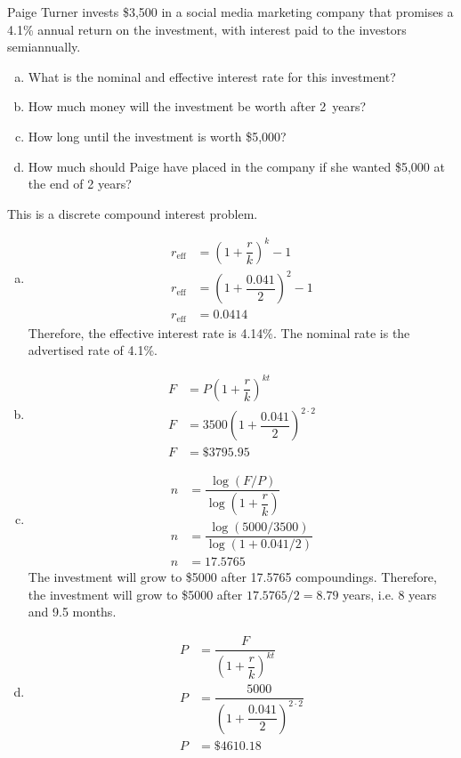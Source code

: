 \documentclass[11pt,letterpaper]{article}
\begin{document}
\newpage





 Paige Turner invests \$3,500 in a social media marketing company that promises a 4.1\% annual return on the investment, with interest paid to the investors semiannually. 
\begin{enumerate}[(a)]
\item What is the nominal and effective interest rate for this investment?
\item How much money will the investment be worth after 2~years?
\item How long until the investment is worth \$5,000?
\item How much should Paige have placed in the company if she wanted \$5,000 at the end of 2 years? 
\end{enumerate} \pspace

\sol This is a discrete compound interest problem.
\begin{enumerate}[(a)]
\item 
	\[
	\begin{aligned}
	r_{\text{eff}}&= \left(1 + \dfrac{r}{k} \right)^k - 1 \\
	r_{\text{eff}}&= \left(1 + \dfrac{0.041}{2} \right)^2 - 1 \\
	r_{\text{eff}}&= 0.0414
	\end{aligned}
	\]
Therefore, the effective interest rate is 4.14\%. The nominal rate is the advertised rate of 4.1\%.

\item 
	\[
	\begin{aligned}
	F&= P \left(1 + \dfrac{r}{k} \right)^{kt} \\
	F&= 3500 \left(1 + \dfrac{0.041}{2} \right)^{2 \cdot 2} \\
	F&= \$3795.95
	\end{aligned}
	\] \pspace

\item 
	\[
	\begin{aligned}
	n&= \dfrac{\log(F/P)}{\log\left(1 + \dfrac{r}{k} \right)} \\
	n&= \dfrac{\log(5000/3500)}{\log(1 + 0.041/2)} \\
	n&= 17.5765
	\end{aligned}
	\]
The investment will grow to \$5000 after 17.5765 compoundings. Therefore, the investment will grow to \$5000 after $17.5765/2= 8.79$ years, i.e. 8 years and 9.5 months. \pspace

\item 
	\[
	\begin{aligned}
	P&= \dfrac{F}{\left(1 + \dfrac{r}{k} \right)^{kt}} \\
	P&= \dfrac{5000}{\left(1 + \dfrac{0.041}{2} \right)^{2 \cdot 2}} \\
	P&= \$4610.18
	\end{aligned}
	\]
\end{enumerate}
\end{document}
